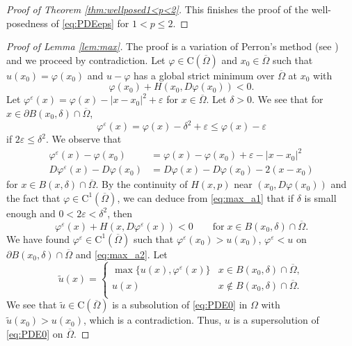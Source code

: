 \documentclass[12pt,reqno]{amsart}
\numberwithin{figure}{section}
\theoremstyle{plain}
\theoremstyle{remark}
\numberwithin{equation}{section}
\newcommand{\rmC}{\mathrm{C}}
\begin{document}
\begin{proof} [Proof of Theorem \ref{thm:wellposed1<p<2}]
\noindent This finishes the proof of the well-posedness of \eqref{eq:PDEeps} for $1<p\leq2$. 
\end{proof}


\begin{proof}[Proof of Lemma \ref{lem:max}] The proof is a variation of Perron's method (see \cite{Capuzzo-Dolcetta1990}) and we proceed by contradiction. Let $\varphi\in \rmC(\overline{\Omega})$ and $x_0\in \overline{\Omega}$ such that $u(x_0) = \varphi(x_0)$ and $u-\varphi$ has a global strict minimum over $\overline{\Omega}$ at $x_0$ with 
\begin{equation}\label{eq:max_a1}
      \varphi(x_0) + H(x_0,D\varphi(x_0)) < 0.
\end{equation}
Let $\varphi^\varepsilon(x) = \varphi(x) - |x-x_0|^2 + \varepsilon$ for $x\in \overline{\Omega}$. Let $\delta > 0$. We see that for $x\in \partial B(x_0,\delta)\cap \overline{\Omega}$,
\begin{equation*}
    \varphi^\varepsilon(x) = \varphi(x) - \delta^2 +\varepsilon \leq \varphi(x) - \varepsilon
\end{equation*}
if $2\varepsilon \leq \delta^2$. We observe that
\begin{equation*}
    \begin{split}
    \varphi^\varepsilon(x) - \varphi(x_0)  &= \varphi(x)-\varphi(x_0) + \varepsilon - |x-x_0|^2 \\
    D\varphi^\varepsilon(x) - D\varphi(x_0) &= D\varphi(x) - D\varphi(x_0) - 2(x-x_0)
    \end{split}
\end{equation*}
for $x\in B(x,\delta)\cap \overline{\Omega}$. By the continuity of $H(x,p)$ near $(x_0,D\varphi(x_0))$ and the fact that $\varphi\in \rmC^1(\overline{\Omega})$, we can deduce from \eqref{eq:max_a1} that if $\delta$ is small enough and $0<2\varepsilon < \delta^2$, then
\begin{equation}\label{eq:max_a2}
      \varphi^\varepsilon(x)+H(x,D\varphi^\varepsilon(x)) < 0 \qquad\text{for}\;x\in B(x_0,\delta)\cap \overline{\Omega}.
\end{equation}
We have found $\varphi^\varepsilon\in \mathrm{C}^1(\overline{\Omega})$ such that $\varphi^\varepsilon(x_0)>u(x_0)$, $\varphi^\varepsilon<u$ on $\partial B(x_0,\delta)\cap \overline{\Omega}$ and \eqref{eq:max_a2}. Let
\begin{equation*}
    \tilde{u}(x) = \begin{cases}
    \max \big\lbrace u(x),\varphi^\varepsilon(x) \big\rbrace &x\in B(x_0,\delta)\cap \overline{\Omega},\\
    u(x)&x\notin B(x_0,\delta)\cap \overline{\Omega}.\\
    \end{cases}
\end{equation*}
We see that $\tilde{u}\in \rmC(\overline{\Omega})$ is a subsolution of \eqref{eq:PDE0} in $\Omega$ with $\tilde{u}(x_0) > u(x_0)$, which is a contradiction. Thus, $u$ is a supersolution of \eqref{eq:PDE0} on $\overline{\Omega}$.
\end{proof}
\end{document}
